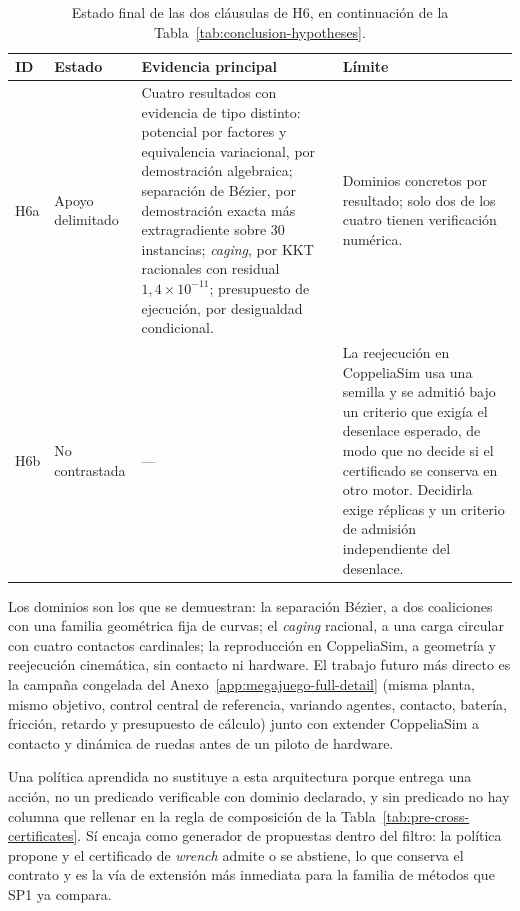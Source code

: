 \begin{table}[H]
  \centering
  \caption[Estado final de las dos cláusulas de H6.]{Estado final de las dos
  cláusulas de H6, en continuación de la Tabla~\ref{tab:conclusion-hypotheses}.}
  \label{tab:conclusion-hypothesis-h6}
  \scriptsize
  \setlength{\tabcolsep}{3pt}
  \begin{tabularx}{\textwidth}{@{}p{0.8cm}p{1.75cm}p{5.1cm}X@{}}
    \toprule
    ID & Estado & Evidencia principal & Límite \\
    \midrule
    H6a & Apoyo delimitado & Cuatro resultados con evidencia de tipo distinto: potencial por factores y equivalencia variacional, por demostración algebraica; separación de Bézier, por demostración exacta más extragradiente sobre 30 instancias; \emph{caging}, por KKT racionales con residual $1{,}4\times10^{-11}$; presupuesto de ejecución, por desigualdad condicional. & Dominios concretos por resultado; solo dos de los cuatro tienen verificación numérica. \\
    H6b & No contrastada & --- & La reejecución en CoppeliaSim usa una semilla y se admitió bajo un criterio que exigía el desenlace esperado, de modo que no decide si el certificado se conserva en otro motor. Decidirla exige réplicas y un criterio de admisión independiente del desenlace. \\
    \bottomrule
  \end{tabularx}
  \viuownsource
\end{table}

Los dominios son los que se demuestran: la separación Bézier, a dos coaliciones
con una familia geométrica fija de curvas; el \emph{caging} racional, a una
carga circular con cuatro contactos cardinales; la reproducción en CoppeliaSim,
a geometría y reejecución cinemática, sin contacto ni hardware. El trabajo
futuro más directo es la campaña congelada del
Anexo~\ref{app:megajuego-full-detail} (misma planta, mismo objetivo, control
central de referencia, variando agentes, contacto, batería, fricción, retardo y
presupuesto de cálculo) junto con extender CoppeliaSim a contacto y dinámica de
ruedas antes de un piloto de hardware.

Una política aprendida no sustituye a esta arquitectura porque entrega una
acción, no un predicado verificable con dominio declarado, y sin predicado no
hay columna que rellenar en la regla de composición de la
Tabla~\ref{tab:pre-cross-certificates}. Sí encaja como generador de
propuestas dentro del filtro: la política propone y el certificado de
\emph{wrench} admite o se abstiene, lo que conserva el contrato y es la vía de
extensión más inmediata para la familia de métodos que SP1 ya compara.

